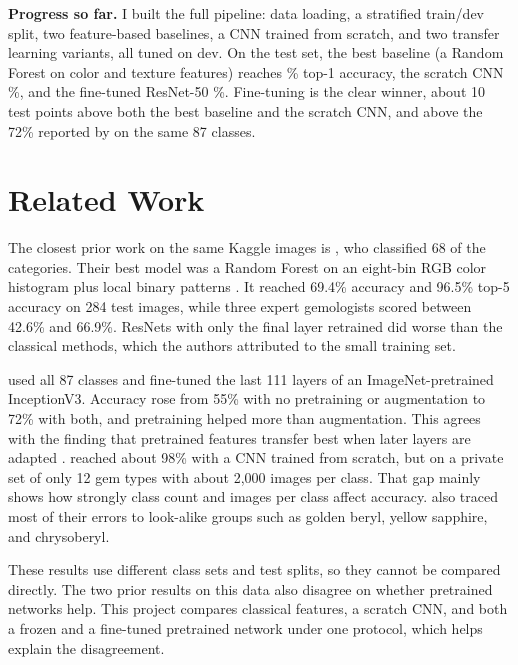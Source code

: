 \documentclass{article}
\begin{document}
\textbf{Progress so far.} I built the full pipeline: data loading, a stratified train/dev split, two feature-based baselines, a CNN trained from scratch, and two transfer learning variants, all tuned on dev. On the test set, the best baseline (a Random Forest on color and texture features) reaches \RFTest\% top-1 accuracy, the scratch CNN \CNNTest\%, and the fine-tuned ResNet-50 \FTTest\%. Fine-tuning is the clear winner, about 10 test points above both the best baseline and the scratch CNN, and above the 72\% reported by \citet{freire2022gemstone} on the same 87 classes.

\section{Related Work}

The closest prior work on the same Kaggle images is \citet{chow2022gemstone}, who classified 68 of the categories. Their best model was a Random Forest \citep{breiman2001random} on an eight-bin RGB color histogram plus local binary patterns \citep{ojala2002multiresolution}. It reached 69.4\% accuracy and 96.5\% top-5 accuracy on 284 test images, while three expert gemologists scored between 42.6\% and 66.9\%. ResNets with only the final layer retrained did worse than the classical methods, which the authors attributed to the small training set.

\citet{freire2022gemstone} used all 87 classes and fine-tuned the last 111 layers of an ImageNet-pretrained InceptionV3. Accuracy rose from 55\% with no pretraining or augmentation to 72\% with both, and pretraining helped more than augmentation. This agrees with the finding that pretrained features transfer best when later layers are adapted \citep{yosinski2014transferable}. \citet{judixon2023gemstone} reached about 98\% with a CNN trained from scratch, but on a private set of only 12 gem types with about 2,000 images per class. That gap mainly shows how strongly class count and images per class affect accuracy. \citet{freire2022gemstone} also traced most of their errors to look-alike groups such as golden beryl, yellow sapphire, and chrysoberyl.

These results use different class sets and test splits, so they cannot be compared directly. The two prior results on this data also disagree on whether pretrained networks help. This project compares classical features, a scratch CNN, and both a frozen and a fine-tuned pretrained network under one protocol, which helps explain the disagreement.
\end{document}

